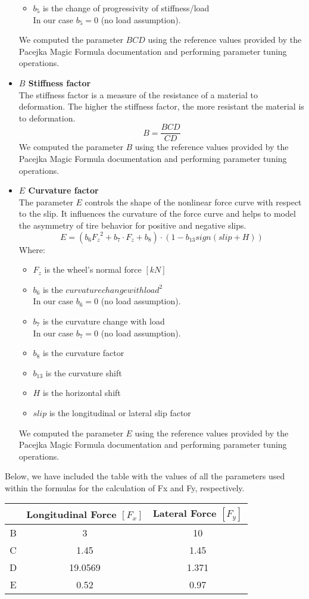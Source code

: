 \begin{itemize}
\begin{itemize}
	  			\item $b_5$ is the change of progressivity of stiffness/load \\
	  				  In our case $b_5 = 0$ (no load assumption).
	  		\end{itemize}
  			We computed the parameter $BCD$ using the reference values provided by the Pacejka Magic Formula documentation and performing parameter tuning operations.
  	\item \textbf{$B$ Stiffness factor} \\
  			The stiffness factor is a measure of the resistance of a material to deformation. The higher the stiffness factor, the more resistant the material is to deformation.
  			\[B = \frac{BCD}{CD}\]
  			We computed the parameter $B$ using the reference values provided by the Pacejka Magic Formula documentation and performing parameter tuning operations.
  	\item \textbf{$E$ Curvature factor} \\
  			The parameter $E$ controls the shape of the nonlinear force curve with respect to the slip. It influences the curvature of the force curve and helps to model the asymmetry of tire behavior for positive and negative slips.
  			\[E = (b_6{F_z}^2 + b_7·F_z + b_8) · (1 - b_{13}sign(slip+H))\]
  			Where:
  			\begin{itemize}
  				\item $F_z$ is the wheel's normal force $[kN]$
  				\item $b_6$ is the ${curvature change with load}^2$ \\ 
  					  In our case $b_6 = 0$ (no load assumption).
  				\item $b_7$ is the curvature change with load \\
  					  In our case $b_7 = 0$ (no load assumption).
  				\item $b_8$ is the curvature factor
  				\item $b_{13}$ is the curvature shift
  				\item $H$ is the horizontal shift
  				\item $slip$ is the longitudinal or lateral slip factor
  			\end{itemize}
  			We computed the parameter $E$ using the reference values provided by the Pacejka Magic Formula documentation and performing parameter tuning operations.
\end{itemize}
Below, we have included the table with the values of all the parameters used within the formulas for the calculation of Fx and Fy, respectively.
\begin{center}
	\begin{tabular}{||c c c||} 
		\hline
		 & Longitudinal Force $[F_x]$ & Lateral Force $[F_y]$ \\ [0.5ex] 
		\hline\hline
		B & 3 & 10 \\ 
		\hline
		C & 1.45 & 1.45 \\
		\hline
		D & 19.0569 & 1.371 \\
		\hline
		E & 0.52 & 0.97 \\
		\hline
	\end{tabular}
\end{center}

